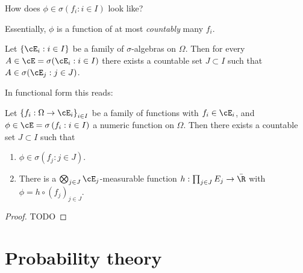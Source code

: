 \begin{frame}
    {How does $\phi \in \sigma(f_i : i\in I)$ look like?}
    
    Essentially, $\phi$ is a function of at most \emph{countably} many $f_i$. 

    \begin{theorem}
        Let $\left\{ \cE_i : i\in I \right\}$ be a family of $\sigma$-algebras
        on $\Omega$. Then for every $A \in \cE = \sigma( \cE_i : i\in I )$
        there exists a countable set $J \subset I$ such that $A \in \sigma(
        \cE_j : j \in J)$. 
    \end{theorem}

    In functional form this reads:
    \begin{theorem}
        Let $\left\{ f_i: \Omega\to\cE_i \right\}_{i\in I}$ be a family of
        functions with $f_i\in\cE_i$, and $\phi\in \cE =\sigma\left( f_i : i\in
        I \right)$ a numeric function on $\Omega$. Then there exists a
        countable set $J \subset I$ such that 
        \begin{enumerate}
            \item $\phi \in \sigma\left( f_j : j\in J \right)$.

            \item There is a $\bigotimes_{j\in J} \cE_j$-measurable function
                $h: \prod_{j\in J} E_j \to \bar\R$ with $\phi = h \circ \left(
                f_j \right)_{j\in J}$.
        \end{enumerate}
    \end{theorem}
\end{frame}

\begin{frame}
    
    \begin{proof}
        TODO
    \end{proof}

\end{frame}







\section{Probability theory}


